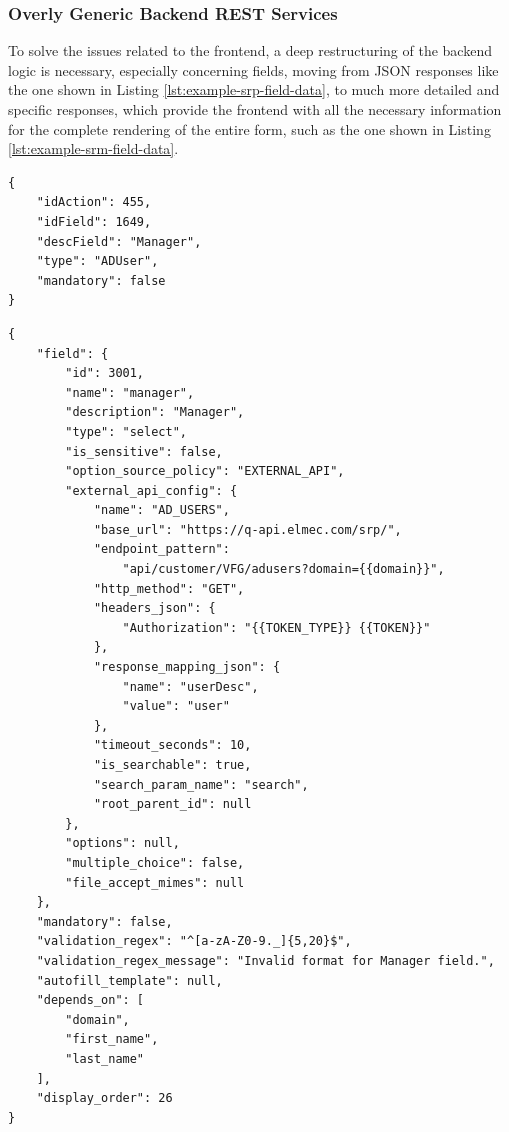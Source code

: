 \subsubsection{Overly Generic Backend REST Services}\label{sec:solution-generic-rest-service}
To solve the issues related to the frontend, a deep restructuring of the backend logic is necessary, especially concerning fields, moving from JSON responses like the one shown in Listing \ref{lst:example-srp-field-data}, to much more detailed and specific responses, which provide the frontend with all the necessary information for the complete rendering of the entire form, such as the one shown in Listing \ref{lst:example-srm-field-data}.

\begin{listing}[htbp]
\begin{verbatim}
{
    "idAction": 455,
    "idField": 1649,
    "descField": "Manager",
    "type": "ADUser",
    "mandatory": false
}
\end{verbatim}
\caption{Example of field data retrieved from legacy SRP System}
\label{lst:example-srp-field-data}
\end{listing}

\begin{listing}[htbp]
\begin{verbatim}
{
    "field": {
        "id": 3001,
        "name": "manager",
        "description": "Manager",
        "type": "select",
        "is_sensitive": false,
        "option_source_policy": "EXTERNAL_API",
        "external_api_config": {
            "name": "AD_USERS",
            "base_url": "https://q-api.elmec.com/srp/",
            "endpoint_pattern": 
                "api/customer/VFG/adusers?domain={{domain}}",
            "http_method": "GET",
            "headers_json": {
                "Authorization": "{{TOKEN_TYPE}} {{TOKEN}}"
            },
            "response_mapping_json": {
                "name": "userDesc",
                "value": "user"
            },
            "timeout_seconds": 10,
            "is_searchable": true,
            "search_param_name": "search",
            "root_parent_id": null
        },
        "options": null,
        "multiple_choice": false,
        "file_accept_mimes": null
    },
    "mandatory": false,
    "validation_regex": "^[a-zA-Z0-9._]{5,20}$",
    "validation_regex_message": "Invalid format for Manager field.",
    "autofill_template": null,
    "depends_on": [
        "domain",
        "first_name",
        "last_name"
    ],
    "display_order": 26
}
\end{verbatim}
\caption{Example of field data returned by the new SRM System}
\label{lst:example-srm-field-data}
\end{listing}

